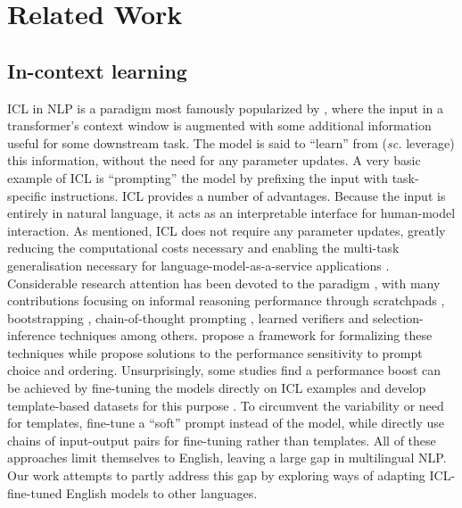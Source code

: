 \documentclass[11pt]{article}
\begin{document}
\section{Related Work}

\subsection{In-context learning}

ICL in NLP is a paradigm most famously popularized by \citet{brown_language_2020}, where the input
in a transformer's context window is augmented with some additional information useful for some
downstream task. The model is said to ``learn''  from (\textit{sc.} leverage) this information,
without the need for any parameter updates. A very basic example of ICL is ``prompting'' the model
by prefixing the input with task-specific instructions. ICL provides a number of advantages. Because
the input is entirely in natural language, it acts as an interpretable interface for human-model
interaction. As mentioned, ICL does not require any parameter updates, greatly reducing the
computational costs necessary and enabling the multi-task generalisation necessary for
language-model-as-a-service applications \citep{sun_black-box_2022}. Considerable research attention
has been devoted to the paradigm \citep{liu_what_2022,lu_fantastically_2022,wu_self-adaptive_2022},
with many contributions focusing on informal reasoning performance through scratchpads
\citep{nye_show_2021}, bootstrapping \citep{zelikman_star_2022}, chain-of-thought prompting
\citep{wei_chain--thought_2022,wang_self-consistency_2023}, learned verifiers
\citep{cobbe_training_2021} and selection-inference \citep{creswell_selection-inference_2023}
techniques among others. \citet{dohan_language_2022} propose a framework for formalizing these
techniques while \citet{zhao_calibrate_2021} propose solutions to the performance sensitivity to
prompt choice and ordering. Unsurprisingly, some studies find a performance boost can be achieved by
fine-tuning the models directly on ICL examples \citep{sanh_multitask_2022,wang_benchmarking_2022}
and develop template-based datasets for this purpose
\citep{bach_promptsource_2022,mishra_cross-task_2022}. To circumvent the variability or need for
templates, \citet{lester_power_2021} fine-tune a ``soft'' prompt instead of the model, while
\citet{min_metaicl_2022} directly use chains of input-output pairs for fine-tuning rather than
templates. All of these approaches limit themselves to English, leaving a large gap in multilingual
NLP. Our work attempts to partly address this gap by exploring ways of adapting ICL-fine-tuned
English models to other languages.
\end{document}
